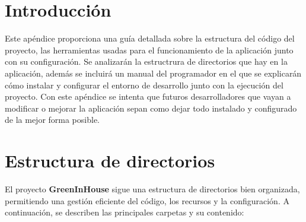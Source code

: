 
\section{Introducción}
Este apéndice proporciona una guía detallada sobre la estructura del código del proyecto, las herramientas usadas para el funcionamiento de la aplicación junto con su configuración.
Se analizarán la estructrura de directorios que hay en la aplicación, además se incluirá un manual del programador en el que se explicarán cómo instalar y configurar el entorno de desarrollo junto con la ejecución del proyecto.
Con este apéndice se intenta que futuros desarrolladores que vayan a modificar o mejorar la aplicación sepan como dejar todo instalado y configurado de la mejor forma posible.

\section{Estructura de directorios}

El proyecto \textbf{GreenInHouse} sigue una estructura de directorios bien organizada, permitiendo una gestión eficiente del código, los recursos y la configuración. A continuación, se describen las principales carpetas y su contenido:

